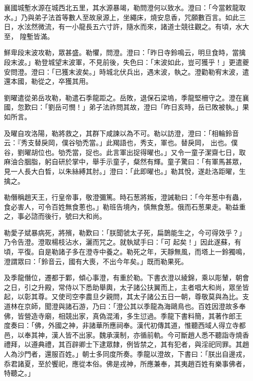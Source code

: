 \begin{pinyinscope}
 襄國城塹水源在城西北五里，其水源暴竭，勒問澄何以致水。澄曰：「今當敕龍取水。」乃與弟子法首等數人至故泉源上，坐繩床，燒安息香，咒願數百言。如此三日，水泫然微流，有一小龍長五六寸許，隨水而來，諸道士競往觀之。有頃，水大至，
 隍塹皆滿。



 鮮卑段末波攻勒，眾甚盛。勒懼，問澄。澄曰：「昨日寺鈴鳴云，明旦食時，當擒段末波。」勒登城望末波軍，不見前後，失色曰：「末波如此，豈可獲乎！」更遣夔安問澄。澄曰：「已獲末波矣。」時城北伏兵出，遇末波，執之。澄勸勒宥末波，遣還本國，勒從之，卒獲其用。



 劉曜遣從弟岳攻勒，勒遣石季龍距之。岳敗，退保石梁塢，季龍堅柵守之。澄在襄國，忽歎曰：「劉岳可憫！」弟子法祚問其故，澄曰「昨日亥時，岳已敗被執。」果如所言。



 及曜自攻洛陽，勒將救之，其群下咸諫以為不可。勒以訪澄，澄曰：「相輪鈴音云：『秀支替戾岡，僕谷劬禿當。」此羯語也，秀支，軍也。替戾岡，
 出也。僕谷，劉曜胡位也。劬禿當，捉也。此言軍出捉得曜也。」又令一童子潔齋七日，取麻油合胭脂，躬自研於掌中，舉手示童子，粲然有輝。童子驚曰：「有軍馬甚眾，見一人長大白晳，以朱絲縛其肘。」澄曰：「此即曜也。」勒其悅，遂赴洛距曜，生擒之。



 勒僭稱趙天王，行皇帝事，敬澄彌篤。時石葱將叛，澄誡勒曰：「今年葱中有蟲，食必害人，可令百姓無食蔥也。」勒班告境內，慎無食葱。俄而石葱果走。勒益重之，事必諮而後行，號曰大和尚。



 勒愛子斌暴病死，將殯，勒歎曰：「朕聞虢太子死，扁鵲能生之，今可得效乎？」乃令告澄。澄取楊枝沾水，灑而咒之。就執斌手曰：「可
 起矣！」因此遂蘇，有頃，平復。自是勒諸子多在澄寺中養之。勒死之年，天靜無風，而塔上一鈴獨鳴，澄謂眾曰：「鈴音云，國有大喪，不出今年矣。」既而勒果死。



 及季龍僭位，遷都于鄴，傾心事澄，有重於勒。下書衣澄以綾錦，乘以彫輦，朝會之日，引之升殿，常侍以下悉助舉輿，太子諸公扶翼而上，主者唱大和尚，眾坐皆起，以彰其尊。又使司空李農旦夕親問，其太子諸公五日一朝，尊敬莫與為比。支道林在京師，聞澄與諸石游，乃曰：「澄公其以季龍為海鷗鳥也。百姓因澄故多奉佛，皆營造寺廟，相競出家，真偽混淆，多生愆過。季龍下書料簡，其著作郎王
 度奏曰：「佛，外國之神，非諸華所應祠奉。漢代初傳其道，惟聽西域人得立寺都邑，以奉其神，漢人皆不出家。魏承漢制，亦循前軌。今可斷趙人悉不聽詣寺燒香禮拜，以遵典禮，其百辟卿士下逮眾隸，例皆禁之，其有犯者，與淫祀同罪。其趙人為沙門者，還服百姓。」朝士多同度所奏。季龍以澄故，下書曰：「朕出自邊戎，忝君諸夏，至於饗祀，應從本俗。佛是戎神，所應兼奉，其夷趙百姓有樂事佛者，特聽之。」




\end{pinyinscope}
